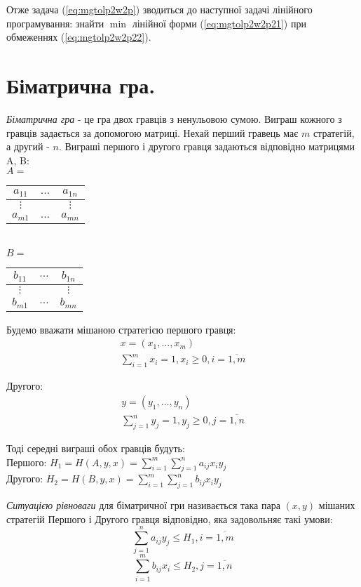 \documentclass[12pt,a4paper]{book}
\begin{document}
Отже задача (\ref{eq:mgtolp2w2p}) зводиться до наступної задачі лінійного програмування: знайти $\min$ лінійної форми (\ref{eq:mgtolp2w2p21}) при обмеженнях (\ref{eq:mgtolp2w2p22}).

\section{Біматрична гра.}

\emph{Біматрична гра} - це гра двох гравців з ненульовою сумою. Виграш кожного з гравців задається за допомогою матриці. Нехай перший гравець має $m$ стратегій, а другий - $n$. Виграші першого і другого гравця задаються відповідно матрицями A, B:\\
$A =$
\begin{tabular}{|c|c|c|}
\hline
$a_{1 1}$&$\dots$&$a_{1 n}$\\
\hline
$\vdots$&&$\vdots$\\
\hline
$a_{m 1}$&$\dots$&$a_{m n}$\\
\hline
\end{tabular}\\
$B =$
\begin{tabular}{|c|c|c|}
\hline
$b_{1 1}$&$\dots$&$b_{1 n}$\\
\hline
$\vdots$&&$\vdots$\\
\hline
$b_{m 1}$&$\dots$&$b_{m n}$\\
\hline
\end{tabular}

Будемо вважати мішаною стратегією першого гравця:
\[\begin{array}{l}
x = (x_1, \dots, x_m)\\
\sum_{i=1}^m x_i = 1, x_i \geq 0, i = \overline{1,m}
\end{array}\]

Другого:
\[\begin{array}{l}
y = (y_1, \dots, y_n)\\
\sum_{j=1}^n y_j = 1, y_j \geq 0, j = \overline{1,n}
\end{array}\]

Тоді середні виграші обох гравців будуть:\\
Першого: $\displaystyle H_1=H(A,y,x)=\sum_{i=1}^m \sum_{j=1}^n a_{ij} x_i y_j$\\
Другого: $\displaystyle H_2=H(B,y,x)=\sum_{i=1}^m \sum_{j=1}^n b_{ij} x_i y_j$

\emph{Ситуацією рівноваги} для біматричної гри називається така пара $(x,y)$ мішаних стратегій Першого і Другого гравця відповідно, яка задовольняє такі умови:
\begin{equation} \sum_{j=1}^n a_{ij} y_j \leq H_1, i=\overline{1,m} \label{eq:bimatrbalance1}\end{equation}
\begin{equation} \sum_{i=1}^m b_{ij} x_i \leq H_2, j=\overline{1,n} \label{eq:bimatrbalance2}\end{equation}
\end{document}

